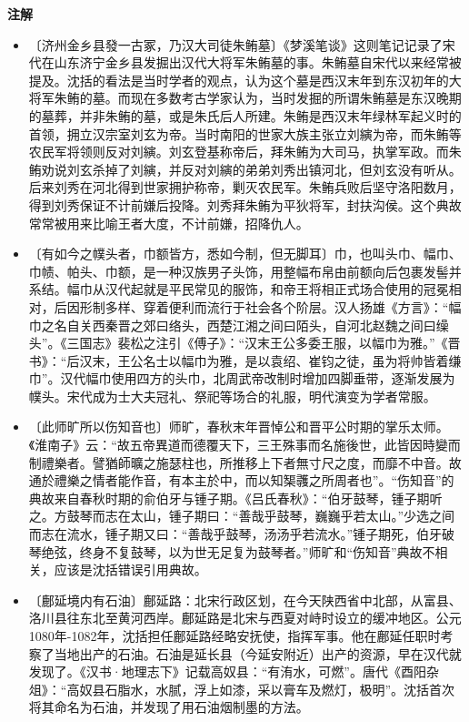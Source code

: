 \documentclass[12pt,UTF-8,openany,a4]{ctexbook}
\begin{document}
\newpage

\begin{Large}
    \noindent\textbf{注解}
\end{Large}


\vspace{-1em}

\begin{itemize}
    \setlength\itemsep{-0.2em}
    \item〔济州金乡县發一古冢，乃汉大司徒朱鲔墓〕{\yiwen 《梦溪笔谈》这则笔记记录了宋代在山东济宁金乡县发掘出汉代大将军朱鲔墓的事。朱鲔墓自宋代以来经常被提及。沈括的看法是当时学者的观点，认为这个墓是西汉末年到东汉初年的大将军朱鲔的墓。而现在多数考古学家认为，当时发掘的所谓朱鲔墓是东汉晚期的墓葬，并非朱鲔的墓，或是朱氏后人所建。朱鲔是西汉末年绿林军起义时的首领，拥立汉宗室刘玄为帝。当时南阳的世家大族主张立刘縯为帝，而朱鲔等农民军将领则反对刘縯。刘玄登基称帝后，拜朱鲔为大司马，执掌军政。而朱鲔劝说刘玄杀掉了刘縯，并反对刘縯的弟弟刘秀出镇河北，但刘玄没有听从。后来刘秀在河北得到世家拥护称帝，剿灭农民军。朱鲔兵败后坚守洛阳数月，得到刘秀保证不计前嫌后投降。刘秀拜朱鲔为平狄将军，封扶沟侯。这个典故常常被用来比喻王者大度，不计前嫌，招降仇人。}
    \item〔有如今之幞头者，巾额皆方，悉如今制，但无脚耳〕{\yiwen 巾，也叫头巾、幅巾、巾帻、帕头、巾额，是一种汉族男子头饰，用整幅布帛由前额向后包裹发髻并系结。幅巾从汉代起就是平民常见的服饰，和帝王将相正式场合使用的冠冕相对，后因形制多样、穿着便利而流行于社会各个阶层。汉人扬雄《方言》：“幅巾之名自关西秦晋之郊曰络头，西楚江湘之间曰陌头，自河北赵魏之间曰缲头”。《三国志》裴松之注引《傅子》：“汉末王公多委王服，以幅巾为雅。”《晋书》：“后汉末，王公名士以幅巾为雅，是以袁绍、崔钧之徒，虽为将帅皆着缣巾”。汉代幅巾使用四方的头巾，北周武帝改制时增加四脚垂带，逐渐发展为幞头。宋代成为士大夫冠礼、祭祀等场合的礼服，明代演变为学者常服。}
    \item〔此师旷所以伤知音也〕{\yiwen 师旷，春秋末年晋悼公和晋平公时期的掌乐太师。《淮南子》云：“故五帝異道而德覆天下，三王殊事而名施後世，此皆因時變而制禮樂者。譬猶師曠之施瑟柱也，所推移上下者無寸尺之度，而靡不中音。故通於禮樂之情者能作音，有本主於中，而以知榘彠之所周者也”。“伤知音”的典故来自春秋时期的俞伯牙与锺子期。《吕氏春秋》：“伯牙鼓琴，锺子期听之。方鼓琴而志在太山，锺子期曰：“善哉乎鼓琴，巍巍乎若太山。”少选之间而志在流水，锺子期又曰：“善哉乎鼓琴，汤汤乎若流水。”锺子期死，伯牙破琴绝弦，终身不复鼓琴，以为世无足复为鼓琴者。”师旷和“伤知音”典故不相关，应该是沈括错误引用典故。}
    \item〔鄜延境内有石油〕{\yiwen 鄜延路：北宋行政区划，在今天陕西省中北部，从富县、洛川县往东北至黄河西岸。鄜延路是北宋与西夏对峙时设立的缓冲地区。公元1080年-1082年，沈括担任鄜延路经略安抚使，指挥军事。他在鄜延任职时考察了当地出产的石油。石油是延长县（今延安附近）出产的资源，早在汉代就发现了。《汉书·地理志下》记载高奴县：“有洧水，可燃”。唐代《酉阳杂俎》：“高奴县石脂水，水腻，浮上如漆，采以膏车及燃灯，极明”。沈括首次将其命名为石油，并发现了用石油烟制墨的方法。}

\end{itemize}
\end{document}

